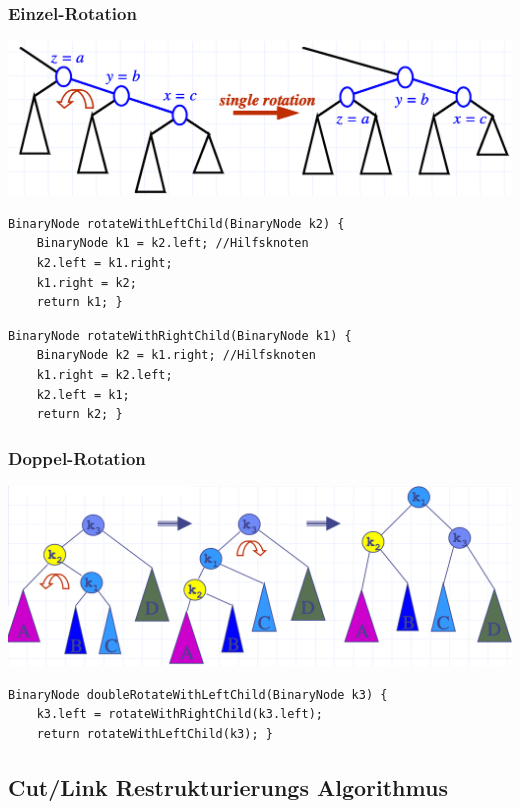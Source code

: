 \subsubsection{Einzel-Rotation}
\begin{center}
    \includegraphics[scale=.22]{graphic/02 AVLTrees/Einzel-Rotationen.png}
\end{center}
\begin{lstlisting}
BinaryNode rotateWithLeftChild(BinaryNode k2) {
    BinaryNode k1 = k2.left; //Hilfsknoten
    k2.left = k1.right;
    k1.right = k2;
    return k1; }
\end{lstlisting}
\begin{lstlisting}
BinaryNode rotateWithRightChild(BinaryNode k1) {
    BinaryNode k2 = k1.right; //Hilfsknoten
    k1.right = k2.left;
    k2.left = k1;
    return k2; }
\end{lstlisting}

\subsubsection{Doppel-Rotation}
\begin{center}
    \includegraphics[scale=.22]{graphic/02 AVLTrees/Doppel-Rotationen.png}
\end{center}
\begin{lstlisting}
BinaryNode doubleRotateWithLeftChild(BinaryNode k3) {
    k3.left = rotateWithRightChild(k3.left);
    return rotateWithLeftChild(k3); }
\end{lstlisting}


\subsection{Cut/Link Restrukturierungs Algorithmus}
